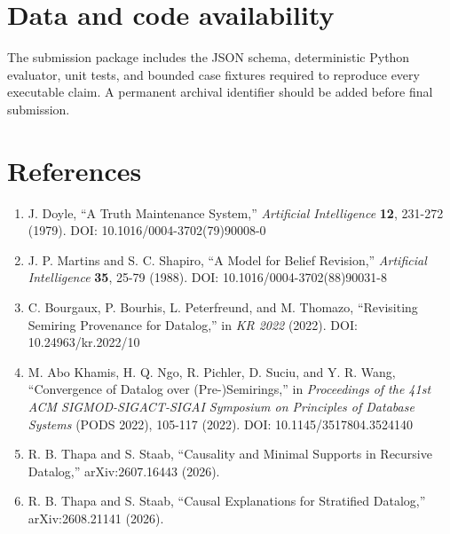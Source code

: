 \documentclass[
  11pt,
]{article}
\providecommand{\tightlist}{%
  \setlength{\itemsep}{0pt}\setlength{\parskip}{0pt}}
\begin{document}
\hypertarget{data-and-code-availability}{%
\section{Data and code availability}\label{data-and-code-availability}}

The submission package includes the JSON schema, deterministic Python
evaluator, unit tests, and bounded case fixtures required to reproduce
every executable claim. A permanent archival identifier should be added
before final submission.

\hypertarget{references}{%
\section{References}\label{references}}

\begin{enumerate}
\def\labelenumi{\arabic{enumi}.}
\tightlist
\item
  J. Doyle, ``A Truth Maintenance System,'' \emph{Artificial
  Intelligence} \textbf{12}, 231-272 (1979). DOI:
  10.1016/0004-3702(79)90008-0
\item
  J. P. Martins and S. C. Shapiro, ``A Model for Belief Revision,''
  \emph{Artificial Intelligence} \textbf{35}, 25-79 (1988). DOI:
  10.1016/0004-3702(88)90031-8
\item
  C. Bourgaux, P. Bourhis, L. Peterfreund, and M. Thomazo, ``Revisiting
  Semiring Provenance for Datalog,'' in \emph{KR 2022} (2022). DOI:
  10.24963/kr.2022/10
\item
  M. Abo Khamis, H. Q. Ngo, R. Pichler, D. Suciu, and Y. R. Wang,
  ``Convergence of Datalog over (Pre-)Semirings,'' in \emph{Proceedings
  of the 41st ACM SIGMOD-SIGACT-SIGAI Symposium on Principles of
  Database Systems} (PODS 2022), 105-117 (2022). DOI:
  10.1145/3517804.3524140
\item
  R. B. Thapa and S. Staab, ``Causality and Minimal Supports in
  Recursive Datalog,'' arXiv:2607.16443 (2026).
\item
  R. B. Thapa and S. Staab, ``Causal Explanations for Stratified
  Datalog,'' arXiv:2608.21141 (2026).
\end{enumerate}
\end{document}
